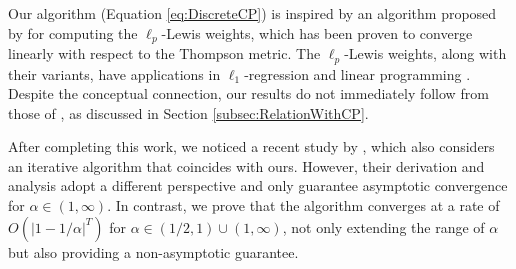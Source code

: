 \documentclass{article}
\begin{document}
Our algorithm (Equation \eqref{eq:DiscreteCP}) is inspired by an algorithm proposed by \citet{Cohen2015} for computing the $\ell_p$-Lewis weights, which has been proven to converge linearly with respect to the Thompson metric.
The $\ell_p$-Lewis weights, along with their variants, have applications in $\ell_1$-regression \cite{Durfee2018,Parulekar2021} and linear programming \cite{Lee2020}.
Despite the conceptual connection, our results do not immediately follow from those of \citet{Cohen2015}, as discussed in Section \ref{subsec:RelationWithCP}. 

After completing this work, we noticed a recent study by \citet{Cheng2024}, which also
considers an iterative algorithm that coincides with ours.
However, their derivation and analysis adopt a different perspective and only guarantee asymptotic convergence for $\alpha\in(1,\infty)$.
In contrast, we prove that %
the 
algorithm converges at a rate of $O\left(\left|1-1/\alpha\right|^T\right)$ for $\alpha\in(1/2,1)\cup(1,\infty)$, 
not only extending the range of $\alpha$ but also providing a non-asymptotic guarantee. 


\end{document}
